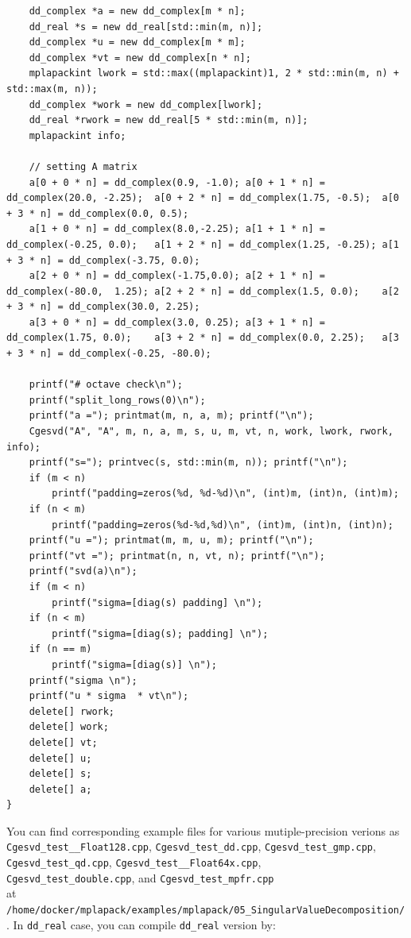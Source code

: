 \documentclass[12pt]{article}
\begin{document}
\begin{lstlisting}
    dd_complex *a = new dd_complex[m * n];
    dd_real *s = new dd_real[std::min(m, n)];
    dd_complex *u = new dd_complex[m * m];
    dd_complex *vt = new dd_complex[n * n];
    mplapackint lwork = std::max((mplapackint)1, 2 * std::min(m, n) + std::max(m, n));
    dd_complex *work = new dd_complex[lwork];
    dd_real *rwork = new dd_real[5 * std::min(m, n)];
    mplapackint info;

    // setting A matrix
    a[0 + 0 * n] = dd_complex(0.9, -1.0); a[0 + 1 * n] = dd_complex(20.0, -2.25);  a[0 + 2 * n] = dd_complex(1.75, -0.5);  a[0 + 3 * n] = dd_complex(0.0, 0.5);
    a[1 + 0 * n] = dd_complex(8.0,-2.25); a[1 + 1 * n] = dd_complex(-0.25, 0.0);   a[1 + 2 * n] = dd_complex(1.25, -0.25); a[1 + 3 * n] = dd_complex(-3.75, 0.0);
    a[2 + 0 * n] = dd_complex(-1.75,0.0); a[2 + 1 * n] = dd_complex(-80.0,  1.25); a[2 + 2 * n] = dd_complex(1.5, 0.0);    a[2 + 3 * n] = dd_complex(30.0, 2.25);
    a[3 + 0 * n] = dd_complex(3.0, 0.25); a[3 + 1 * n] = dd_complex(1.75, 0.0);    a[3 + 2 * n] = dd_complex(0.0, 2.25);   a[3 + 3 * n] = dd_complex(-0.25, -80.0);

    printf("# octave check\n");
    printf("split_long_rows(0)\n");
    printf("a ="); printmat(m, n, a, m); printf("\n");
    Cgesvd("A", "A", m, n, a, m, s, u, m, vt, n, work, lwork, rwork, info);
    printf("s="); printvec(s, std::min(m, n)); printf("\n");
    if (m < n)
        printf("padding=zeros(%d, %d-%d)\n", (int)m, (int)n, (int)m);
    if (n < m)
        printf("padding=zeros(%d-%d,%d)\n", (int)m, (int)n, (int)n);
    printf("u ="); printmat(m, m, u, m); printf("\n");
    printf("vt ="); printmat(n, n, vt, n); printf("\n");
    printf("svd(a)\n");
    if (m < n)
        printf("sigma=[diag(s) padding] \n");
    if (n < m)
        printf("sigma=[diag(s); padding] \n");
    if (n == m)
        printf("sigma=[diag(s)] \n");
    printf("sigma \n");
    printf("u * sigma  * vt\n");
    delete[] rwork;
    delete[] work;
    delete[] vt;
    delete[] u;
    delete[] s;
    delete[] a;
}
\end{lstlisting}
You can find corresponding example files for various mutiple-precision verions as {\tt Cgesvd\_test\_\_Float128.cpp},
{\tt Cgesvd\_test\_dd.cpp}, {\tt Cgesvd\_test\_gmp.cpp}, {\tt Cgesvd\_test\_qd.cpp},
{\tt Cgesvd\_test\_\_Float64x.cpp}, \\
{\tt Cgesvd\_test\_double.cpp},  and {\tt Cgesvd\_test\_mpfr.cpp}\\
at {\tt /home/docker/mplapack/examples/mplapack/05\_SingularValueDecomposition/}.
In {\tt dd\_real} case, you can compile {\tt dd\_real} version by:
\end{document}
